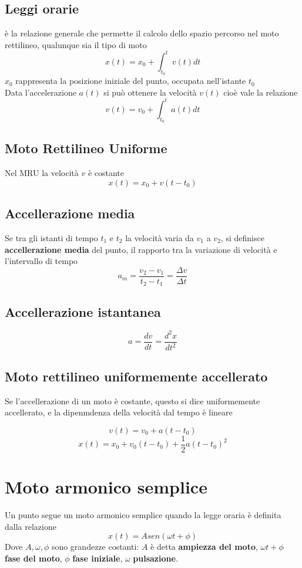 \documentclass[a4paper]{report}
\begin{document}
  \subsection{Leggi orarie}
  è la relazione generale che permette il calcolo dello spazio percorso nel moto rettilineo, qualunque sia il tipo di moto
  \[ x(t) = x_0 + \int_{t_0}^t v(t) dt \]
  $x_0$ rappresenta la posizione iniziale del punto, occupata nell'istante $t_0$
  \\
    Data l'accelerazione $a(t)$ si può ottenere la velocità $v(t)$ cioè vale la relazione
  \[ v(t) = v_0 + \int_{t_0}^t a(t) dt\]

  \subsection{Moto Rettilineo Uniforme}
  Nel MRU la velocità $v$ è costante
  \[ x(t) = x_0 + v(t-t_0)\]

  \subsection{Accellerazione media}
  Se tra gli istanti di tempo $t_1$ e $t_2$ la velocità varia da $v_1$ a $v_2$, si definisce \textbf{accellerazione media} del punto, il rapporto tra la variazione di velocità e l'intervallo di tempo
  \[ a_m = \frac{v_2-v_1}{t_2-t_1} = \frac{\Delta v}{\Delta t} \]

  \subsection{Accellerazione istantanea}
  \[ a = \frac{dv}{dt} = \frac{d^2x}{dt^2} \]

  \subsection{Moto rettilineo uniformemente accellerato}
  Se l'accellerazione di un moto è costante, questo si dice uniformemente accellerato, e la dipenmdenza della velocità dal tempo è lineare

  \[ v(t) = v_0 + a(t-t_0) \]
  \[ x(t) = x_0 + v_0(t-t_0) + \frac{1}{2} a(t-t_0)^2  \]

  \section{Moto armonico semplice}
  Un punto segue un moto armonico semplice quando la legge oraria è definita dalla relazione
  \[ x(t) = A sen(\omega t + \phi) \]
    Dove $A, \omega, \phi$ sono grandezze costanti: $A$ è detta \textbf{ampiezza del moto}, $\omega t + \phi$ \textbf{fase del moto}, $\phi$ \textbf{fase iniziale}, $\omega$ \textbf{pulsazione}.
\end{document}
